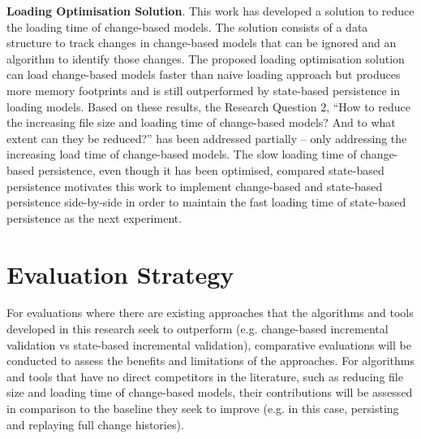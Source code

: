 \documentclass[12pt, a4paper]{report} \usepackage[titletoc]{appendix}
\begin{document}
\textbf{Loading Optimisation Solution}. This work has developed a solution to reduce the loading time of change-based models. The solution consists of a data structure to track changes in change-based models that can be ignored and an algorithm to identify those changes. The proposed loading optimisation solution can load change-based models faster than naive loading approach but produces more memory footprints and is still outperformed by state-based persistence in loading models. Based on these results, the Research Question 2, ``How to reduce the increasing file size and loading time of change-based models? And to what extent can they be reduced?'' has been addressed partially -- only addressing the increasing load time of change-based models. The slow loading time of change-based persistence, even though it has been optimised, compared state-based persistence motivates this work to implement change-based and state-based persistence side-by-side in order to maintain the fast loading time of state-based persistence as the next experiment.

\section{Evaluation Strategy}
\label{sec:evaluation_strategy}
For evaluations where there are existing approaches that the algorithms and tools developed in this research seek to outperform (e.g. change-based incremental validation vs state-based incremental validation), comparative evaluations will be conducted to assess the benefits and limitations of the approaches. For algorithms and tools that have no direct competitors in the literature, such as reducing file size and loading time of change-based models, their contributions will be assessed in comparison to the baseline they seek to improve (e.g. in this case, persisting and replaying full change histories).  
\end{document}
